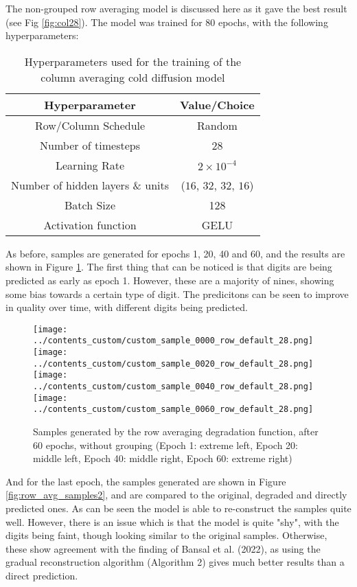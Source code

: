 \documentclass[12pt]{report} %
\begin{document}
The non-grouped row averaging model is discussed here as it gave the best result (see Fig \ref{fig:col28}). The model was trained for 80 epochs, with the following hyperparameters:

\begin{table}[ht]
  \centering
  \begin{tabular}{c c}
    \hline
    Hyperparameter & Value/Choice \\
    \hline
    Row/Column Schedule & Random \\
    Number of timesteps & 28 \\
    Learning Rate & $2 \times 10^{-4}$ \\
    Number of hidden layers \& units & ($16$, $32$, $32$, $16$) \\
    Batch Size & 128 \\
    Activation function & GELU \\
    \hline
  \end{tabular}
  \captionsetup{font=footnotesize}
  \caption{Hyperparameters used for the training of the column averaging cold diffusion model}
  \label{tab:hyperparams3}
\end{table}

As before, samples are generated for epochs 1, 20, 40 and 60, and the results are shown in Figure \ref{fig:row_avg_samples}. The first thing that can be noticed is that digits are being predicted as early as epoch 1. However, these are a majority of nines, showing some bias towards a certain type of digit. The predicitons can be seen to improve in quality over time, with different digits being predicted.

\begin{figure}[ht]
  \centering
  \texttt{[image: ../contents\_custom/custom\_sample\_0000\_row\_default\_28.png]}
  \texttt{[image: ../contents\_custom/custom\_sample\_0020\_row\_default\_28.png]}
  \texttt{[image: ../contents\_custom/custom\_sample\_0040\_row\_default\_28.png]}
  \texttt{[image: ../contents\_custom/custom\_sample\_0060\_row\_default\_28.png]}
  \captionsetup{font=footnotesize}
  \caption{Samples generated by the row averaging degradation function, after 60 epochs, without grouping (Epoch 1: extreme left, Epoch 20: middle left, Epoch 40: middle right, Epoch 60: extreme right)}
  \label{fig:row_avg_samples}
\end{figure}

And for the last epoch, the samples generated are shown in Figure \ref{fig:row_avg_samples2}, and are compared to the original, degraded and directly predicted ones. As can be seen the model is able to re-construct the samples quite well. However, there is an issue which is that the model is quite "shy", with the digits being faint, though looking similar to the original samples. Otherwise, these show agreement with the finding of Bansal et al. (2022), as using the gradual reconstruction algorithm (Algorithm 2) gives much better results than a direct prediction.
\end{document}

